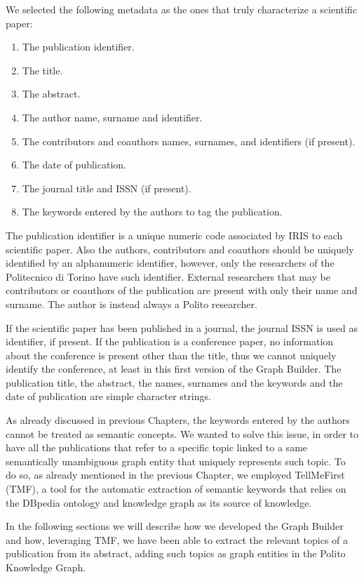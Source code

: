 \documentclass[%
    corpo=13.5pt,
    twoside,
    oldstyle,
    tipotesi=magistrale,
    greek,
    evenboxes
]{toptesi}
\begin{document}
We selected the following metadata as the ones that truly characterize a
scientific paper:

\begin{enumerate}
    \item The publication identifier.
    \item The title.
    \item The abstract.
    \item The author name, surname and identifier.
    \item The contributors and coauthors names, surnames, and identifiers
        (if present).
    \item The date of publication.
    \item The journal title and ISSN (if present).
    \item The keywords entered by the authors to tag the publication.
\end{enumerate}

The publication identifier is a unique numeric code associated by IRIS to each
scientific paper. Also the authors, contributors and coauthors should be
uniquely identified by an alphanumeric identifier, however, only the researchers
of the Politecnico di Torino have such identifier. External
researchers that may be contributors or coauthors of the publication are present
with only their name and surname.
The author is instead always a Polito researcher.

If the scientific paper has been published in a journal, the journal ISSN
is used as identifier, if present.
If the publication is a conference paper, no information about the conference
is present other than the title, thus we cannot uniquely identify the
conference, at least in this first version of the Graph Builder.
The publication title, the abstract, the names, surnames and the keywords and
the date of publication are simple character strings.

As already discussed in previous Chapters, the keywords entered by the authors
cannot be treated as semantic concepts. We wanted to solve this issue, in order
to have all the publications that refer to a specific topic linked to a
same semantically unambiguous graph entity that uniquely represents such topic.
To do so, as already mentioned in the previous Chapter, we employed
TellMeFirst (TMF), a tool for the automatic extraction of
semantic keywords that relies on the DBpedia ontology and knowledge graph as
its source of knowledge.

In the following sections we will describe how we developed the Graph Builder
and how, leveraging TMF, we have been able to extract the relevant topics of a
publication from its abstract, adding such topics as graph
entities in the Polito Knowledge Graph.
\end{document}
